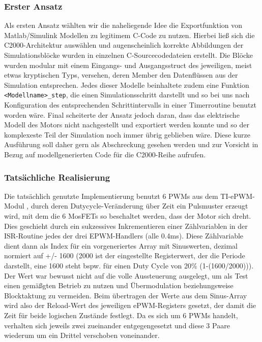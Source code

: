 \subsubsection{Erster Ansatz}
  Als ersten Ansatz wählten wir die naheliegende Idee die Exportfunktion von Matlab/Simulink Modellen zu legitimem C-Code zu nutzen. Hierbei ließ sich die C2000-Architektur auswählen und augenscheinlich korrekte Abbildungen der Simulationsblöcke wurden in einzelnen C-Sourcecodedateien erstellt. Die Blöcke wurden modular mit einem Eingangs- und Ausgangsstruct des jeweiligen, meist etwas kryptischen Typs, versehen, deren Member den Datenflüssen aus der Simulation entsprechen. Jedes dieser Modelle beinhaltete zudem eine Funktion {\lstinline[breaklines=true]$<Modellname>_step$}, die einen Simulationsschritt darstellt und so bei uns nach Konfiguration des entsprechenden Schrittintervalls in einer Timerroutine benutzt worden wäre. Final scheiterte der Ansatz jedoch daran, dass das elektrische Modell des Motors nicht nachgestellt und exportiert werden konnte und so der komplexeste Teil der Simulation noch immer übrig geblieben wäre. Diese kurze Ausführung soll daher gern als Abschreckung gesehen werden und zur Vorsicht in Bezug auf modellgenerierten Code für die C2000-Reihe aufrufen.

\subsubsection{Tatsächliche Realisierung}
  Die tatsächlich genutzte Implementierung benutzt 6 PWMs aus dem TI-ePWM-Modul , durch deren Dutycycle-Veränderung über Zeit ein Pulsmuster erzeugt wird, mit dem die 6 MosFETs so beschaltet werden, dass der Motor sich dreht. Dies geschieht durch ein sukzessives Inkrementieren einer Zählvariablen in der ISR-Routine jedes der drei EPWM-Handlers (alle 0.4ms). Diese Zählvariable dient dann als Index für ein vorgeneriertes Array mit Sinuswerten, dezimal normiert auf +/- 1600 (2000 ist der eingestellte Registerwert, der die Periode darstellt, eine 1600 steht bspw. für einen Duty Cycle von 20\% (1-(1600/2000))). Der Wert war bewusst nicht auf die volle Aussteuerung ausgelegt, um als Test einen gemäßgten Betrieb zu nutzen und Übermodulation beziehungsweise Blocktaktung zu vermeiden. Beim übertragen der Werte aus dem Sinus-Array wird also der Reload-Wert des jeweiligen ePWM-Registers gesetzt, der damit die Zeit für beide logischen Zustände festlegt. Da es sich um 6 PWMs handelt, verhalten sich jeweils zwei zueinander entgegengesetzt und diese 3 Paare wiederum um ein Drittel verschoben voneinander.  
 
